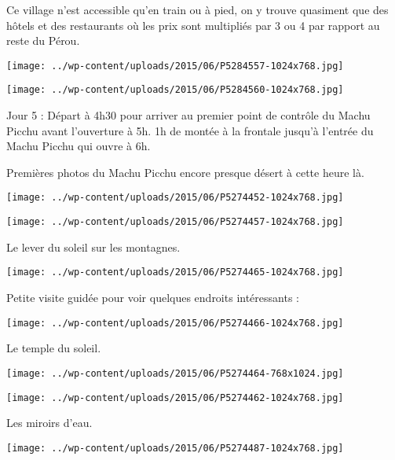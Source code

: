 Ce village n'est accessible qu'en train ou à pied, on y trouve quasiment que des hôtels et des restaurants où les prix sont multipliés par 3 ou 4 par rapport au reste du Pérou. 
\begin{center} \texttt{[image: ../wp-content/uploads/2015/06/P5284557-1024x768.jpg]} \end{center}
\begin{center} \texttt{[image: ../wp-content/uploads/2015/06/P5284560-1024x768.jpg]} \end{center}

Jour 5 :  Départ à 4h30 pour arriver au premier point de contrôle du Machu Picchu avant l'ouverture à 5h.  1h de montée à la frontale jusqu'à l'entrée du Machu Picchu qui ouvre à 6h. 
 
Premières photos du Machu Picchu encore presque désert à cette heure là. 
\begin{center} \texttt{[image: ../wp-content/uploads/2015/06/P5274452-1024x768.jpg]} \end{center}
\begin{center} \texttt{[image: ../wp-content/uploads/2015/06/P5274457-1024x768.jpg]} \end{center}

Le lever du soleil sur les montagnes. 
\begin{center} \texttt{[image: ../wp-content/uploads/2015/06/P5274465-1024x768.jpg]} \end{center}
\pagebreak

Petite visite guidée pour voir quelques endroits intéressants : 
\begin{center} \texttt{[image: ../wp-content/uploads/2015/06/P5274466-1024x768.jpg]} \end{center}

Le temple du soleil. 
\begin{center} \texttt{[image: ../wp-content/uploads/2015/06/P5274464-768x1024.jpg]} \end{center}

\begin{center} \texttt{[image: ../wp-content/uploads/2015/06/P5274462-1024x768.jpg]} \end{center}

Les miroirs d'eau. 
\begin{center} \texttt{[image: ../wp-content/uploads/2015/06/P5274487-1024x768.jpg]} \end{center}
\pagebreak


